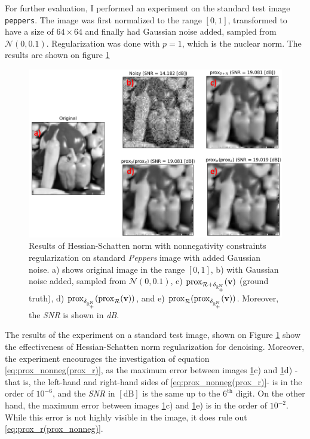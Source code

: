 For further evaluation, I performed an experiment on the standard test image \texttt{peppers}. The image was first normalized to the range $[0, 1]$, transformed to have a size of $64\times 64$ and finally had Gaussian noise added, sampled from $\mathcal{N}(0, 0.1)$. Regularization was done with $p=1$, which is the nuclear norm. The results are shown on figure \ref{fig:hs_experiment}
\begin{figure}[H]
  \begin{center}
  \includegraphics[scale = 0.6]{images/Peppers_experiment.png}
  \caption{Results of Hessian-Schatten norm with nonnegativity constraints regularization on standard \textit{Peppers} image with added Gaussian noise. a) shows original image in the range $[0, 1]$, b) with Gaussian noise added, sampled from $\mathcal{N}(0, 0.1)$, c) $\mathrm{prox}_{\mathcal{R} + \delta_{\rm \mathbb{R}_+^N}}(\mathbf{v})$ (ground truth), d) $\mathrm{prox}_{\delta_{\rm \mathbb{R}_+^N}}(\mathrm{prox}_{\mathcal{R}}(\mathbf{v}))$, and e) $\mathrm{prox}_{\mathcal{R}}(\mathrm{prox}_{\delta_{\rm \mathbb{R}_+^N}}(\mathbf{v}))$. Moreover, the \textit{SNR} is shown in \textit{dB}.}
  \label{fig:hs_experiment}
  \end{center}
\end{figure}

The results of the experiment on a standard test image, shown on Figure \ref{fig:hs_experiment} show the effectiveness of Hessian-Schatten norm regularization for denoising. Moreover, the experiment encourages the investigation of equation \eqref{eq:prox_nonneg(prox_r)}, as the maximum error between images \ref{fig:hs_experiment}c) and \ref{fig:hs_experiment}d) -that is, the left-hand and right-hand sides of \eqref{eq:prox_nonneg(prox_r)}- is in the order of $10^{-6}$, and the \textit{SNR} in $[\mathrm{dB}]$ is the same up to the $6^{\mathrm{th}}$ digit. On the other hand, the maximum error between images \ref{fig:hs_experiment}c) and \ref{fig:hs_experiment}e) is in the order of $10^{-2}$. While this error is not highly visible in the image, it does rule out \eqref{eq:prox_r(prox_nonneg)}. 

